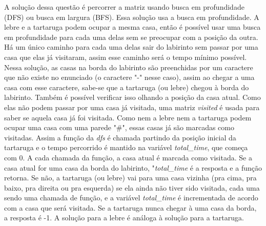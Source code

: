 \documentclass[11pt,fancychapters]{article}
\begin{document}
\noindent
A solução dessa questão é percorrer a matriz usando busca em profundidade (DFS) ou busca em largura (BFS). Essa solução usa a busca em profundidade. A lebre e a tartaruga podem ocupar a mesma casa, então é possível usar uma busca em profundidade para cada uma delas sem se preocupar com a posição da outra. Há um único caminho para cada uma delas sair do labirinto sem passar por uma casa que elas já visitaram, assim esse caminho será o tempo mínimo possível. Nessa solução, as casas na borda do labirinto são preenchidas por um caractere que não existe no enunciado (o caractere "-" nesse caso), assim ao chegar a uma casa com esse caractere, sabe-se que a tartaruga (ou lebre) chegou à borda do labirinto. Também é possível verificar isso olhando a posição da casa atual. Como elas não podem passar por uma casa já visitada, uma matriz \emph{visited} é usada para saber se aquela casa já foi visitada. Como nem a lebre nem a tartaruga podem ocupar uma casa com uma parede "\#", essas casas já são marcadas como visitadas. Assim a função da \emph{dfs} é chamada partindo da posição inicial da tartaruga e o tempo percorrido é mantido na variável \emph{total\_time}, que começa com 0. A cada chamada da função, a casa atual é marcada como visitada. Se a casa atual for uma casa da borda do labirinto, "\emph{total\_time} é a resposta e a função retorna. Se não, a tartaruga (ou lebre) vai para uma casa vizinha (pra cima, pra baixo, pra direita ou pra esquerda) se ela ainda não tiver sido visitada, cada uma sendo uma chamada de função, e a variável \emph{total\_time} é incrementada de acordo com a casa que será visitada. Se a tartaruga nunca chegar à uma casa da borda, a resposta é -1. A solução para a lebre é análoga à solução para a tartaruga.\\
\end{document}

